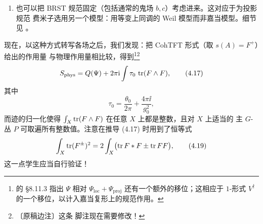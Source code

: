 \begin{enumerate}[label=\arabic*., leftmargin=2.2em, start=6]
  \item 也可以把 BRST 规范固定（包括通常的鬼场 $b,c$）考虑进来。这对应于为投影规范
    费米子选用另一个模型：用等变上同调的 Weil 模型而非嘉当模型。细节见 \cite{ref4}。
\end{enumerate}


现在，以这种方式转写各场之后，我们发现：把 CohTFT 形式（取 $s(A)=F^{+}$）给出的作用量
与物理作用量相比较，得到\footnote{\cite{ref4} 的 §8.11.3 指出 $\Psi$ 相对
$\Psi_{\mathrm{loc}}+\Psi_{\mathrm{proj}}$ 还有一个额外的移位；这相应于 $1$-形式
$V^{\dagger}$ 的一个移位，以计入嘉当复形上的规范作用。}\footnote{〔原稿边注〕这条
脚注现在需要修改！}
\begin{equation}
  S_{\mathrm{phys}}=Q(\Psi)+2\pi\mathrm{i}\int\tau_{0}\,\operatorname{tr}(F\wedge F),
  \tag{4.17}
\end{equation}
其中
\begin{equation}
  \tau_{0}=\frac{\theta_{0}}{2\pi}+\frac{4\pi\ii}{g_{0}^{2}},
  \tag{4.18}
\end{equation}
而迹的归一化使得 $\int_{X}\operatorname{tr}(F\wedge F)$ 在任意 $X$ 上都是整数，且对 $X$ 上适当的
主 $G$-丛 $P$ 可取遍所有整数值。注意在推导 (4.17) 时用到了恒等式
\begin{equation}
  \int_{X}\operatorname{tr}(F^{\pm})^{2}=2\int_{X}\bigl(\operatorname{tr} F\ast F\pm\operatorname{tr} FF\bigr),
  \tag{4.19}
\end{equation}
这一点学生应当自行验证！



